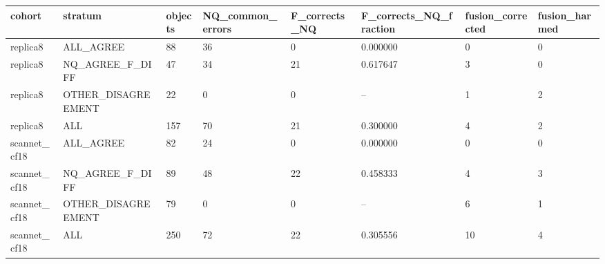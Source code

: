 \begin{tabular}{llllllll}
\toprule
cohort & stratum & objects & NQ\_common\_errors & F\_corrects\_NQ & F\_corrects\_NQ\_fraction & fusion\_corrected & fusion\_harmed \\
\midrule
replica8 & ALL\_AGREE & 88 & 36 & 0 & 0.000000 & 0 & 0 \\
replica8 & NQ\_AGREE\_F\_DIFF & 47 & 34 & 21 & 0.617647 & 3 & 0 \\
replica8 & OTHER\_DISAGREEMENT & 22 & 0 & 0 & -- & 1 & 2 \\
replica8 & ALL & 157 & 70 & 21 & 0.300000 & 4 & 2 \\
scannet\_cf18 & ALL\_AGREE & 82 & 24 & 0 & 0.000000 & 0 & 0 \\
scannet\_cf18 & NQ\_AGREE\_F\_DIFF & 89 & 48 & 22 & 0.458333 & 4 & 3 \\
scannet\_cf18 & OTHER\_DISAGREEMENT & 79 & 0 & 0 & -- & 6 & 1 \\
scannet\_cf18 & ALL & 250 & 72 & 22 & 0.305556 & 10 & 4 \\
\bottomrule
\end{tabular}
